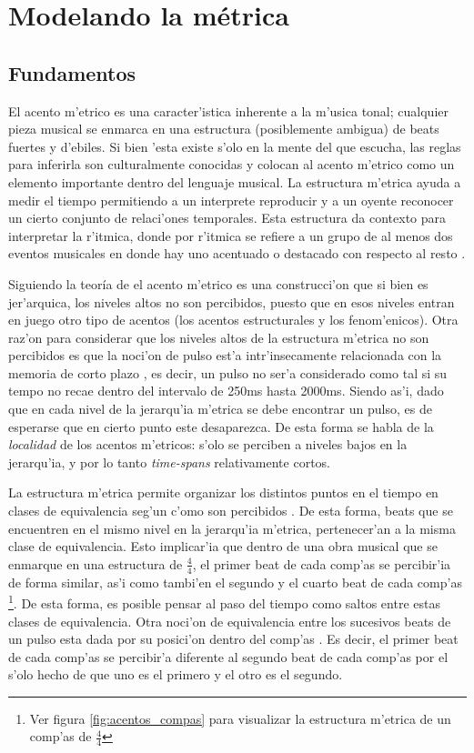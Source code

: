 \section{Modelando la m\'etrica}
\label{sec:metric_model}
\subsection{Fundamentos}
\label{sec:metric_fundamentos}
El acento m'etrico es una caracter'istica inherente a la m'usica tonal; cualquier pieza musical se enmarca en una estructura 
(posiblemente ambigua) de beats fuertes y d'ebiles. Si bien 'esta existe s'olo en la mente del que escucha, las reglas para inferirla son culturalmente conocidas 
y colocan al acento m'etrico como un elemento importante dentro del lenguaje musical. La estructura m'etrica ayuda a medir el tiempo permitiendo a un interprete 
reproducir y a un oyente reconocer un cierto conjunto de relaci'ones temporales. Esta estructura da contexto para interpretar la r'itmica,  
donde por r'itmica se refiere a un grupo de al menos dos eventos musicales en donde hay uno acentuado o destacado con respecto al resto \citep{CooperMeyer60}.


Siguiendo la teor\'ia de \cite{LerdahlJackendoff83} el acento m'etrico es una construcci'on que si bien es jer'arquica, los niveles altos no son percibidos, puesto
que en esos niveles entran en juego otro tipo de acentos (los acentos estructurales y los fenom'enicos). 
Otra raz'on para considerar que los niveles altos de la estructura m'etrica no son percibidos es que la noci'on de pulso est'a intr'insecamente relacionada 
con la memoria de corto plazo \citep[p. 167]{snyder2001}, es decir, un pulso no ser'a considerado como tal si su tempo no recae dentro del intervalo de 250ms hasta 
2000ms. Siendo as'i, dado que en cada nivel de la jerarqu'ia m'etrica se debe encontrar un pulso, es de esperarse que en cierto punto este desaparezca.
De esta forma se habla de la \emph{localidad} de los acentos m'etricos: 
s'olo se perciben a niveles bajos en la jerarqu'ia, y por lo tanto \emph{time-spans} relativamente cortos. 

La estructura m'etrica permite organizar los distintos puntos en el tiempo en clases de equivalencia seg'un c'omo son percibidos \citep{Benjamin84}.
De esta forma, beats que se encuentren en el mismo nivel en la jerarqu'ia m'etrica, pertenecer'an a la misma clase de equivalencia.
Esto implicar'ia que dentro de una obra musical que se enmarque en una estructura de $\frac{4}{4}$, el primer beat de cada comp'as se percibir'ia de forma similar, 
as'i como tambi'en el segundo y el cuarto beat de cada comp'as \footnote{Ver figura \ref{fig:acentos_compas} para visualizar la estructura m'etrica de un comp'as de 
$\frac{4}{4}$}.
De esta forma, es posible pensar al paso del tiempo como saltos entre estas clases de equivalencia. 
Otra noci'on de equivalencia entre los sucesivos beats de un pulso esta dada por su posici'on dentro del comp'as \citep{clarke1987categorical}. Es decir, el primer beat
de cada comp'as se percibir'a diferente al segundo beat de cada comp'as por el s'olo hecho de que uno es el primero y el otro es el segundo.

